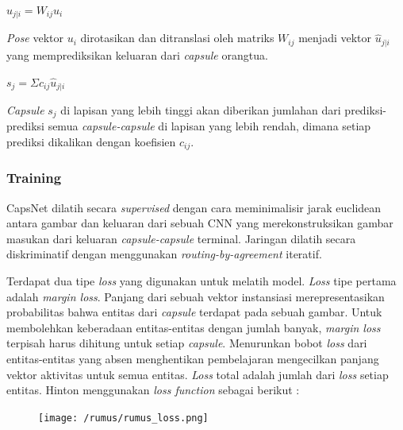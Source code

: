 \documentclass{article}
\begin{document}
	   	\begin{center}
	   		\Large $\hat{u}_{j|i} = W_{ij}u_{i}$
	   	\end{center}
	   	
	   	\par
	   	\textit{Pose} vektor $u_{i}$ dirotasikan dan ditranslasi oleh matriks $W_{ij}$ menjadi vektor $\hat{u}_{j|i}$ yang memprediksikan keluaran dari \textit{capsule} orangtua.
	   	
	   	\begin{center}
	   		\Large $s_{j} = \Sigma c_{ij} \hat{u}_{j|i}$
	   	\end{center}
	   
	   \par
	   \textit{Capsule} $s_{j}$ di lapisan yang lebih tinggi akan diberikan jumlahan dari prediksi-prediksi semua \textit{capsule-capsule} di lapisan yang lebih rendah, dimana setiap prediksi dikalikan dengan koefisien $c_{ij}$.
	   	
	   	\subsubsection{Training}
	   	CapsNet dilatih secara \textit{supervised} dengan cara meminimalisir jarak euclidean antara gambar dan keluaran dari sebuah CNN yang merekonstruksikan gambar masukan dari keluaran \textit{capsule-capsule} terminal. Jaringan dilatih secara diskriminatif dengan menggunakan \textit{routing-by-agreement} iteratif. 
	   	\par
	   	Terdapat dua tipe \textit{loss} yang digunakan untuk melatih model. \textit{Loss} tipe pertama adalah \textit{margin loss}. Panjang dari sebuah vektor instansiasi merepresentasikan probabilitas bahwa entitas dari \textit{capsule} terdapat pada sebuah gambar. Untuk membolehkan keberadaan entitas-entitas dengan jumlah banyak, \textit{margin loss} terpisah harus dihitung untuk setiap \textit{capsule}. Menurunkan bobot \textit{loss} dari entitas-entitas yang absen menghentikan pembelajaran mengecilkan panjang vektor aktivitas untuk semua entitas. \textit{Loss} total adalah jumlah dari \textit{loss} setiap entitas. Hinton menggunakan \textit{loss function} sebagai berikut :
	   	
		\begin{figure}[H]
			\centering
			\texttt{[image: /rumus/rumus\_loss.png]}
		\end{figure}
		
\end{document}
